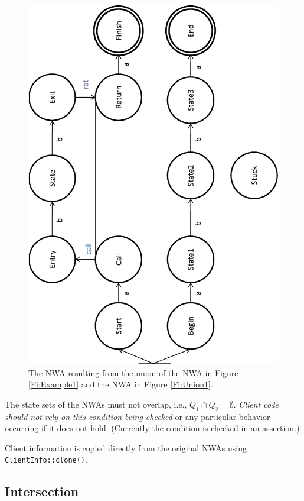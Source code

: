 \begin{figure}[htbp]
  \centering
    \includegraphics[width=12cm]{Figures/Figure4}
  \caption{The NWA resulting from the union of the NWA in Figure
    \ref{Fi:Example1} and the NWA in Figure \ref{Fi:Union1}.}
  \label{Fi:Union2}
\end{figure}

The state sets of the NWAs must not overlap,
i.e., $Q_1 \cap Q_2 = \emptyset$. \textsl{Client code should not rely on
  this condition being checked} or any particular behavior occurring if it
does not hold. (Currently the condition is checked in an assertion.)

Client information is copied directly from the original NWAs using
\texttt{ClientInfo::clone()}.


\subsection{Intersection}
\label{Se:Intersection}

